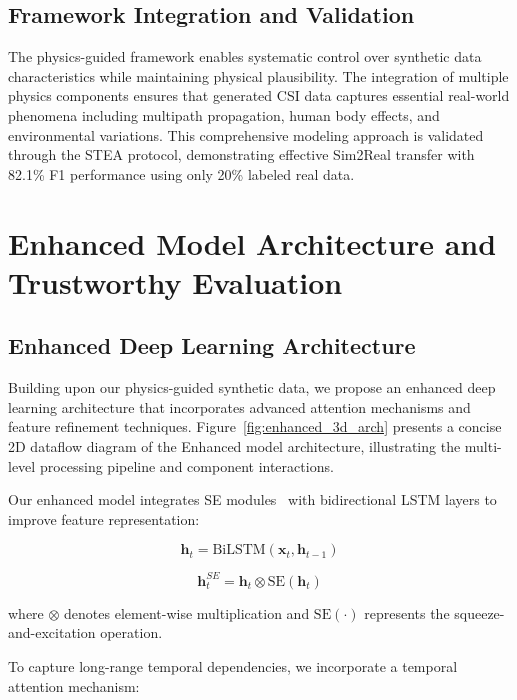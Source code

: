 \documentclass[journal]{IEEEtran}
\begin{document}
\subsection{Framework Integration and Validation}

The physics-guided framework enables systematic control over synthetic data characteristics while maintaining physical plausibility. The integration of multiple physics components ensures that generated CSI data captures essential real-world phenomena including multipath propagation, human body effects, and environmental variations. This comprehensive modeling approach is validated through the STEA protocol, demonstrating effective Sim2Real transfer with 82.1\% F1 performance using only 20\% labeled real data.

\section{Enhanced Model Architecture and Trustworthy Evaluation}

\subsection{Enhanced Deep Learning Architecture}

Building upon our physics-guided synthetic data, we propose an enhanced deep learning architecture that incorporates advanced attention mechanisms and feature refinement techniques. Figure~\ref{fig:enhanced_3d_arch} presents a concise 2D dataflow diagram of the Enhanced model architecture, illustrating the multi-level processing pipeline and component interactions.

Our enhanced model integrates SE modules~\cite{se_networks2018} with bidirectional LSTM layers to improve feature representation:

\begin{equation}
\mathbf{h}_t = \text{BiLSTM}(\mathbf{x}_t, \mathbf{h}_{t-1})
\end{equation}

\begin{equation}
\mathbf{h}_t^{SE} = \mathbf{h}_t \otimes \text{SE}(\mathbf{h}_t)
\end{equation}

where $\otimes$ denotes element-wise multiplication and $\text{SE}(\cdot)$ represents the squeeze-and-excitation operation.

To capture long-range temporal dependencies, we incorporate a temporal attention mechanism:
\end{document}
